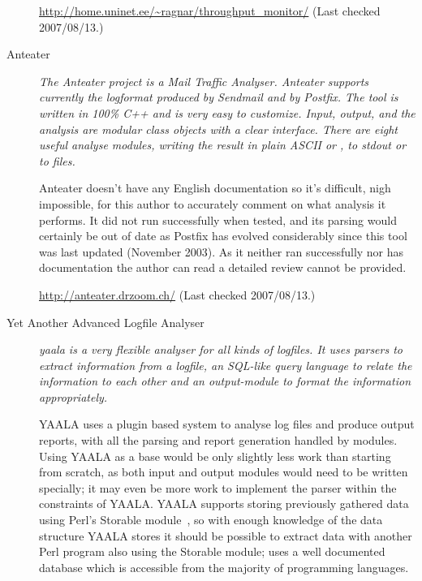\documentclass[a4paper,12pt,draft]{article}
\newcommand{\parsername}{\PLP{}}
\begin{document}
\begin{description}
        \url{http://home.uninet.ee/~ragnar/throughput_monitor/} \newline
        (Last checked 2007/08/13.)

    \item [Anteater] \textit{The Anteater project is a Mail Traffic
        Analyser. Anteater supports currently the logformat produced by
        Sendmail and by Postfix. The tool is written in 100\% C++ and is
        very easy to customize. Input, output, and the analysis are modular
        class objects with a clear interface. There are eight useful
        analyse modules, writing the result in plain ASCII or \HTML{}, to
        stdout or to files.\/}

        Anteater doesn't have any English documentation so it's difficult,
        nigh impossible, for this author to accurately comment on what
        analysis it performs.  It did not run successfully when tested, and
        its parsing would certainly be out of date as Postfix has evolved
        considerably since this tool was last updated (November 2003).  As
        it neither ran successfully nor has documentation the author can
        read a detailed review cannot be provided.

        \url{http://anteater.drzoom.ch/} \newline (Last checked
        2007/08/13.)

    \item [Yet Another Advanced Logfile Analyser] \textit{yaala is a very
        flexible analyser for all kinds of logfiles. It uses parsers to
        extract information from a logfile, an SQL-like query language to
        relate the information to each other and an output-module to format
        the information appropriately.\/}

        YAALA uses a plugin based system to analyse log files and produce
        \HTML{} output reports, with all the parsing and report generation
        handled by modules.  Using YAALA as a base would be only slightly
        less work than starting from scratch, as both input and output
        modules would need to be written specially; it may even be more
        work to implement the parser within the constraints of YAALA\@.
        YAALA supports storing previously gathered data using Perl's
        Storable module~\cite{perl-storable}, so with enough knowledge of
        the data structure YAALA stores it should be possible to extract
        data with another Perl program also using the Storable module;
        \parsername{} uses a well documented database which is accessible
        from the majority of programming languages.


\end{description}
\end{document}
